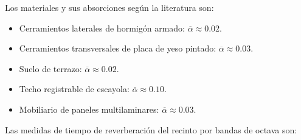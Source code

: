 Los materiales y sus absorciones según la literatura son:
\begin{itemize}
\itemsep0em
  \item Cerramientos laterales de hormigón armado: $\overline{\alpha}\approx0.02$.
  \item Cerramientos transversales de placa de yeso pintado: $\overline{\alpha}\approx0.03$.
  \item Suelo de terrazo: $\overline{\alpha}\approx0.02$.
  \item Techo registrable de escayola: $\overline{\alpha}\approx0.10$.
  \item Mobiliario de paneles multilaminares: $\overline{\alpha}\approx0.03$.
\end{itemize}

Las medidas de tiempo de reverberación del recinto por bandas de octava son:



